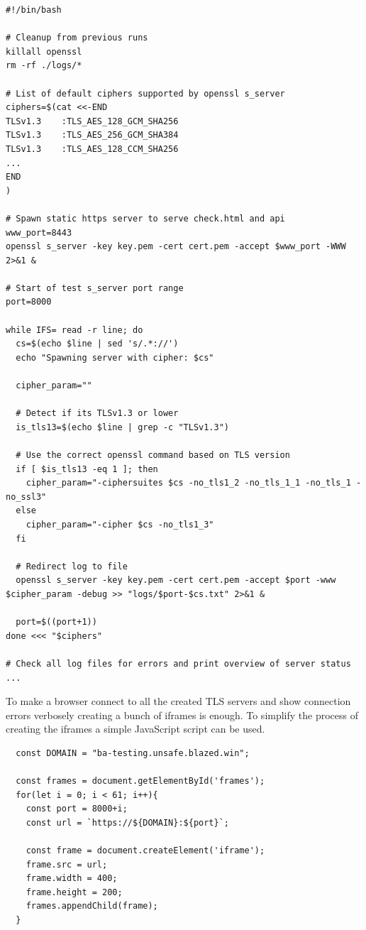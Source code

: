 \documentclass[12pt]{scrbook}
\begin{document}
\begin{verbatim}
#!/bin/bash

# Cleanup from previous runs
killall openssl
rm -rf ./logs/*

# List of default ciphers supported by openssl s_server
ciphers=$(cat <<-END
TLSv1.3    :TLS_AES_128_GCM_SHA256
TLSv1.3    :TLS_AES_256_GCM_SHA384
TLSv1.3    :TLS_AES_128_CCM_SHA256
...
END
)

# Spawn static https server to serve check.html and api
www_port=8443
openssl s_server -key key.pem -cert cert.pem -accept $www_port -WWW 2>&1 &

# Start of test s_server port range
port=8000

while IFS= read -r line; do
  cs=$(echo $line | sed 's/.*://')
  echo "Spawning server with cipher: $cs"

  cipher_param=""

  # Detect if its TLSv1.3 or lower
  is_tls13=$(echo $line | grep -c "TLSv1.3")

  # Use the correct openssl command based on TLS version
  if [ $is_tls13 -eq 1 ]; then
    cipher_param="-ciphersuites $cs -no_tls1_2 -no_tls_1_1 -no_tls_1 -no_ssl3"
  else
    cipher_param="-cipher $cs -no_tls1_3"
  fi

  # Redirect log to file
  openssl s_server -key key.pem -cert cert.pem -accept $port -www $cipher_param -debug >> "logs/$port-$cs.txt" 2>&1 &

  port=$((port+1))
done <<< "$ciphers"

# Check all log files for errors and print overview of server status
...
\end{verbatim}

To make a browser connect to all the created TLS servers and show connection errors verbosely creating a bunch of iframes is enough.
To simplify the process of creating the iframes a simple JavaScript script can be used.

\begin{verbatim}
  const DOMAIN = "ba-testing.unsafe.blazed.win";

  const frames = document.getElementById('frames');
  for(let i = 0; i < 61; i++){
    const port = 8000+i;
    const url = `https://${DOMAIN}:${port}`;

    const frame = document.createElement('iframe');
    frame.src = url;
    frame.width = 400;
    frame.height = 200;
    frames.appendChild(frame);
  }
\end{verbatim}
\end{document}
